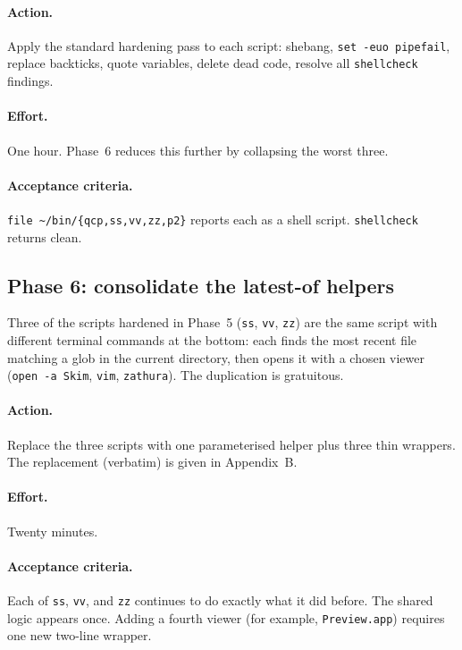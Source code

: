 \documentclass[11pt,letterpaper]{scrartcl}
\begin{document}
\paragraph{Action.} Apply the standard hardening pass to each
script: shebang, \texttt{set -euo pipefail}, replace backticks,
quote variables, delete dead code, resolve all
\texttt{shellcheck} findings.

\paragraph{Effort.} One hour. Phase~6 reduces this further by
collapsing the worst three.

\paragraph{Acceptance criteria.}
\texttt{file \textasciitilde/bin/\{qcp,ss,vv,zz,p2\}} reports each
as a shell script. \texttt{shellcheck} returns clean.

\subsection{Phase 6: consolidate the latest-of helpers}

Three of the scripts hardened in Phase~5 (\texttt{ss},
\texttt{vv}, \texttt{zz}) are the same script with different
terminal commands at the bottom: each finds the most recent file
matching a glob in the current directory, then opens it with a
chosen viewer (\texttt{open -a Skim}, \texttt{vim},
\texttt{zathura}). The duplication is gratuitous.

\paragraph{Action.} Replace the three scripts with one
parameterised helper plus three thin wrappers. The replacement
(verbatim) is given in Appendix~B.

\paragraph{Effort.} Twenty minutes.

\paragraph{Acceptance criteria.} Each of \texttt{ss}, \texttt{vv},
and \texttt{zz} continues to do exactly what it did before. The
shared logic appears once. Adding a fourth viewer (for example,
\texttt{Preview.app}) requires one new two-line wrapper.
\end{document}

